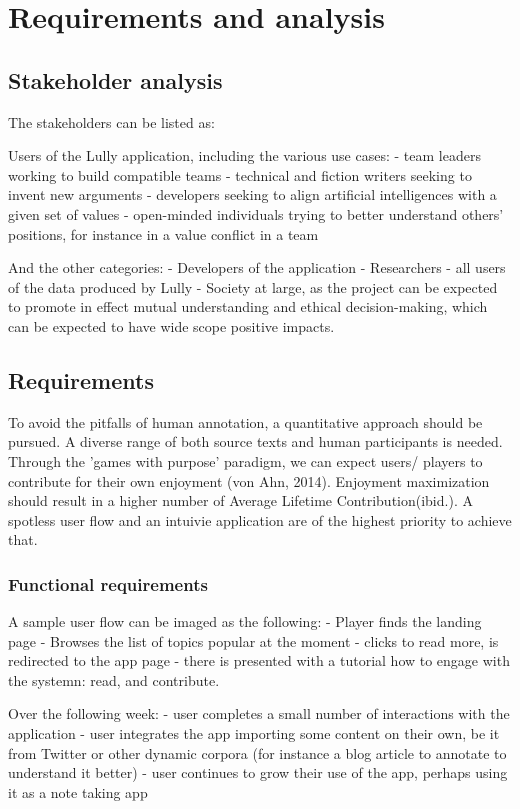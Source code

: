 \documentclass{article}
\begin{document}
\newpage

\chapter{Requirements and analysis}

\section{Stakeholder analysis}
The stakeholders can be listed as:

Users of the Lully application, including the various use cases:
- team leaders working to build compatible teams
- technical and fiction writers seeking to invent new arguments
- developers seeking to align artificial intelligences with a given set of values 
- open-minded individuals trying to better understand others' positions, for instance in a value conflict in a team

And the other categories:
- Developers of the application 
- Researchers - all users of the data produced by Lully
- Society at large, as the project can be expected to promote in effect mutual understanding and ethical decision-making, which can be expected to have wide scope positive impacts.
\section{Requirements}
To avoid the pitfalls of human annotation, a quantitative approach should be pursued. A diverse range of both source texts and human participants is needed.  Through the 'games with purpose' paradigm, we can expect users/ players to contribute for their own enjoyment (von Ahn, 2014). Enjoyment maximization should result in a higher number of Average Lifetime Contribution(ibid.).  A spotless user flow and an intuivie application are of the highest priority to achieve that.

\subsection{Functional requirements}
A sample user flow can be imaged as the following:
- Player finds the landing page
- Browses the list of topics popular at the moment
- clicks to read more, is redirected to the app page
- there is presented with a tutorial how to engage with the systemn: read, and contribute.

Over the following week:
- user completes a small number of interactions with the application
- user integrates the app importing some content on their own, be it from Twitter or other dynamic corpora (for instance a blog article to annotate to understand it better)
- user continues to grow their use of the app, perhaps using it as a note taking app
\end{document}
